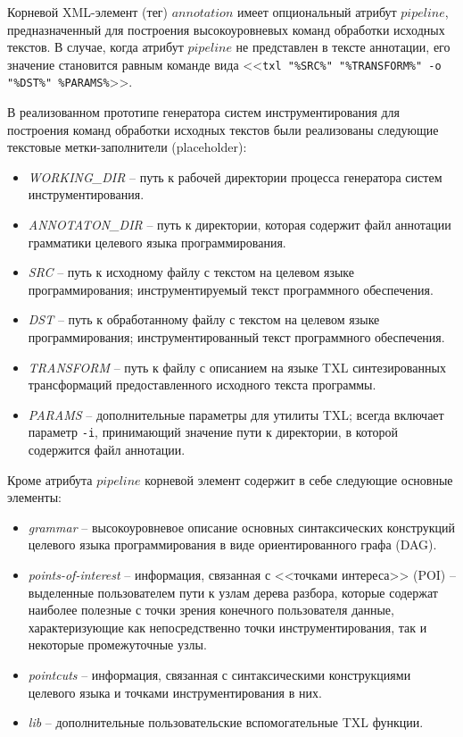 Корневой XML-элемент (тег) $annotation$ имеет опциональный атрибут $pipeline$, предназначенный для построения высокоуровневых команд обработки исходных текстов.
В случае, когда атрибут $pipeline$ не представлен в тексте аннотации, его значение становится равным команде вида <<\lstinline{txl "%SRC%" "%TRANSFORM%" -o "%DST%" %PARAMS%}>>.

В реализованном прототипе генератора систем инструментирования для построения команд обработки исходных текстов были реализованы следующие текстовые метки-заполнители (placeholder):

\begin{itemize}[noitemsep]
  \item \textit{WORKING\_DIR}   -- путь к рабочей директории процесса генератора систем инструментирования.
  \item \textit{ANNOTATON\_DIR} -- путь к директории, которая содержит файл аннотации грамматики целевого языка программирования.
  \item \textit{SRC}            -- путь к исходному файлу с текстом на целевом языке программирования; инструментируемый текст программного обеспечения.
  \item \textit{DST}            -- путь к обработанному файлу с текстом на целевом языке программирования; инструментированный текст программного обеспечения.
  \item \textit{TRANSFORM}      -- путь к файлу с описанием на языке TXL синтезированных трансформаций предоставленного исходного текста программы.
  \item \textit{PARAMS}         -- дополнительные параметры для утилиты TXL; всегда включает параметр \lstinline{-i}, принимающий значение пути к директории, в которой содержится файл аннотации.
\end{itemize}

Кроме атрибута $pipeline$ корневой элемент содержит в себе следующие основные элементы:

\begin{itemize}[noitemsep]
  \item \textit{grammar}            -- высокоуровневое описание основных синтаксических конструкций целевого языка программирования в виде ориентированного графа (DAG).
  \item \textit{points-of-interest} -- информация, связанная с <<точками интереса>> (POI) -- выделенные пользователем пути к узлам дерева разбора, которые содержат наиболее полезные с точки зрения конечного пользователя данные, характеризующие как непосредственно точки инструментирования, так и некоторые промежуточные узлы.
  \item \textit{pointcuts}          -- информация, связанная с синтаксическими конструкциями целевого языка и точками инструментирования в них.
  \item \textit{lib}                -- дополнительные пользовательские вспомогательные TXL функции.
\end{itemize}

